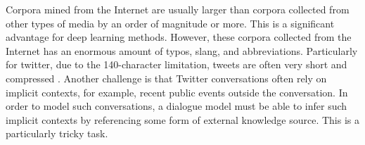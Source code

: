 \documentclass[bsc,frontabs,twoside,singlespacing,parskip,deptreport]{infthesis}     %
\begin{document}
Corpora mined from the Internet are usually larger than corpora collected from other types of media by an order of magnitude or more. This is a significant advantage for deep learning methods. However, these corpora collected from the Internet has an enormous amount of typos, slang, and abbreviations. Particularly for twitter, due to the 140-character limitation, tweets are often very short and compressed \cite{serban2018survey}. Another challenge is that Twitter conversations often rely on implicit contexts, for example, recent public events outside the conversation. In order to model such conversations, a dialogue model must be able to infer such implicit contexts by referencing some form of external knowledge source. This is a particularly tricky task.


\end{document}
